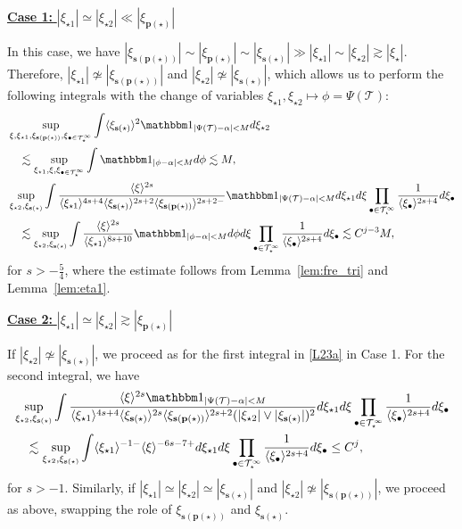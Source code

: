 \documentclass[a4paper,
11pt,  reqno]{amsart}
\newcommand{\jap}[1]{\langle #1 \rangle}
\newcommand{\5}{\textup{V}}
\newcommand{\noi}{\noindent}
\newcommand{\ind}{\mathbbm 1}
\newcommand{\les}{\lesssim}
\theoremstyle{remark}
\newcommand{\bul}{\bullet}
\newcommand{\TT}{\mathcal{T}}
\newcommand{\al}{\alpha}
\newcommand{\pb}{\mathbf{p}}
\newcommand{\sbf}{\mathbf{s}}
\newcommand{\ges}{\gtrsim}
\newcommand{\jb}[1]
{\langle #1 \rangle}
\numberwithin{equation}{section}
\numberwithin{theorem}{section}
\begin{document}
\smallskip
\noi
\underline{\textbf{Case 1:} $|\xi_{\star1}| \simeq |\xi_{\star2}| \ll |\xi_{\pb(\star)}|$}

In this case, we have $|\xi_{\sbf(\pb(\star))}| \sim |\xi_{\pb(\star)}| \sim |\xi_{\sbf(\star)}| \gg |\xi_{\star1}| \sim |\xi_{\star2}| \ges |\xi_\star|$.
Therefore, $|\xi_{\star1}| \not \simeq |\xi_{\sbf(\pb(\star))}| $ and $|\xi_{\star2}| \not \simeq |\xi_{\sbf(\star)}|$, which allows us to perform the following integrals with the change of variables $\xi_{\star1}, \xi_{\star2} \mapsto \phi = \Psi(\TT)$:
\begin{align}\label{L23a}
    & \sup_{ \xi,\xi_{\star1}, \xi_{\sbf(\pb(\star))},  \xi_{\bul\in \TT^\infty_\star}}
    \int
    \jb{\xi_{\sbf(\star)}}^2
    \ind_{|\Psi(\TT)-\al|< M }
    d\xi_{\star2}
    \\
    &
    \quad
    \les
    \sup_{\xi_{\star1}, \xi, \xi_{\bul\in \TT^\infty_\star}}
    \int
    \ind_{|\phi-\al|  < M} d\phi
    \les M
    ,
    \\
    &
    \sup_{\xi_{\star2}, \xi_{\sbf(\star)}}
    \int
    \frac{\jb{\xi}^{2s}   }{ \jb{\xi_{\star1}}^{4s+4} \jb{\xi_{\sbf(\star)}}^{2s+2} \jb{\xi_{\sbf(\pb(\star))}}^{2s+2-} }
    \ind_{|\Psi(\TT)-\al|< M }
    d\xi_{\star1} d\xi
    \prod_{\bul\in\TT^\infty_\star} \frac{1}{\jb{\xi_\bul}^{2s+4}} d\xi_\bul
    \\
    &
    \quad
    \les
    \sup_{\xi_{\star2}, \xi_{\sbf(\star)}}
    \int { \frac{\jb{\xi}^{2s}}{\jap{\xi_{\star1}}^{8s+10}} }\ind_{|\phi-\al|< M} d\phi d\xi \prod_{\bul\in\TT^\infty_\star} \frac{1}{\jb{\xi_\bul}^{2s+4}} d\xi_\bul
    \les C^{j-3 } M
    ,
\end{align}
for $s>-\frac54$, where the estimate follows from Lemma~\ref{lem:fre_tri} and Lemma~\ref{lem:eta1}.


\smallskip
\noi
\underline{\textbf{Case 2:} $|\xi_{\star1}| \simeq |\xi_{\star2}| \ges |\xi_{\pb(\star)}|$}

If $|\xi_{\star2}| \not\simeq |\xi_{\sbf(\star)}|$, we proceed as for the first integral in \eqref{L23a} in Case 1. For the second integral, we have
\begin{align}\label{L23b}
&
    \sup_{\xi_{\star2}, \xi_{\sbf(\star)}}
    \int
    \frac{\jb{\xi}^{2s} \ind_{|\Psi(\TT)-\al|< M }   }{ \jb{\xi_{\star1}}^{4s+4} \jb{\xi_{\sbf(\star)}}^{2s} \jb{\xi_{\sbf(\pb(\star))}}^{2s+2} (|\xi_{\star2}| \lor |\xi_{\sbf(\star)}|)^2  }
    d\xi_{\star1} d\xi
    \prod_{\bul\in\TT^\infty_\star} \frac{1}{\jb{\xi_\bul}^{2s+4}} d\xi_\bul
    \\
    &
    \quad
    \les
    \sup_{\xi_{\star2}, \xi_{\sbf(\star)}}
    \int \jb{\xi_{\star1}}^{-1-} \jb{\xi}^{-6s-7+} d\xi_{\star1} d\xi \prod_{\bul\in\TT^\infty_\star} \frac{1}{\jb{\xi_\bul}^{2s+4}} d\xi_\bul
    \le C^{j} ,
\end{align}
for $s> -1$.
Similarly, if $|\xi_{\star1}| \simeq |\xi_{\star2}| \simeq |\xi_{\sbf(\star)}|$ and $|\xi_{\star2}| \not\simeq |\xi_{\sbf(\pb(\star))}|$, we proceed as above, swapping the role of $\xi_{\sbf(\pb(\star))}$ and $\xi_{\sbf(\star)}$.
\end{document}
